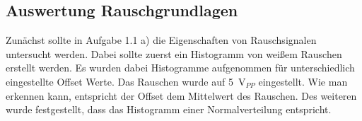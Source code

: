 \documentclass{article}						%
\begin{document}
	\subsection{Auswertung Rauschgrundlagen}
		Zunächst sollte in Aufgabe 1.1 a) die Eigenschaften von Rauschsignalen untersucht werden. Dabei sollte zuerst ein Histogramm von weißem Rauschen erstellt werden. Es wurden dabei Histogramme aufgenommen für unterschiedlich eingestellte Offset Werte. Das Rauschen wurde auf \SI{5}{\volt}$_{PP}$ eingestellt. Wie man erkennen kann, entspricht der Offset dem Mittelwert des Rauschen. Des weiteren wurde festgestellt, dass das Histogramm einer Normalverteilung entspricht.
		
		\begin{figure}[h!]
		\end{figure}
		
\end{document}
